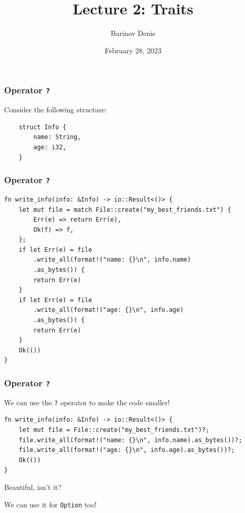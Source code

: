 \documentclass[aspectratio=1610,t]{beamer}
\title{Lecture 2: Traits}
\date{February 28, 2023}
\author{Barinov Denis}
\institute{barinov.diu@gmail.com}
\begin{document}

\begin{frame}
\maketitle
\end{frame}


\begin{frame}[fragile]
\frametitle{Operator \texttt{?}}
Consider the following structure:
\begin{verbatim}
    struct Info {
        name: String,
        age: i32,
    }
\end{verbatim}
\end{frame}


\begin{frame}[fragile,c]
\frametitle{Operator \texttt{?}}
\begin{verbatim}
fn write_info(info: &Info) -> io::Result<()> {
    let mut file = match File::create("my_best_friends.txt") {
        Err(e) => return Err(e),
        Ok(f) => f,
    };
    if let Err(e) = file
        .write_all(format!("name: {}\n", info.name)
        .as_bytes()) {
        return Err(e)
    }
    if let Err(e) = file
        .write_all(format!("age: {}\n", info.age)
        .as_bytes()) {
        return Err(e)
    }
    Ok(())
}
\end{verbatim}
\end{frame}


\begin{frame}[fragile]
\frametitle{Operator \texttt{?}}
We can use the \texttt{?} operator to make the code smaller!

\begin{verbatim}
fn write_info(info: &Info) -> io::Result<()> {
    let mut file = File::create("my_best_friends.txt")?;
    file.write_all(format!("name: {}\n", info.name).as_bytes())?;
    file.write_all(format!("age: {}\n", info.age).as_bytes())?;
    Ok(())
}
\end{verbatim}

Beautiful, isn't it?

We can use it for \texttt{Option} too!
\end{frame}
\end{document}
